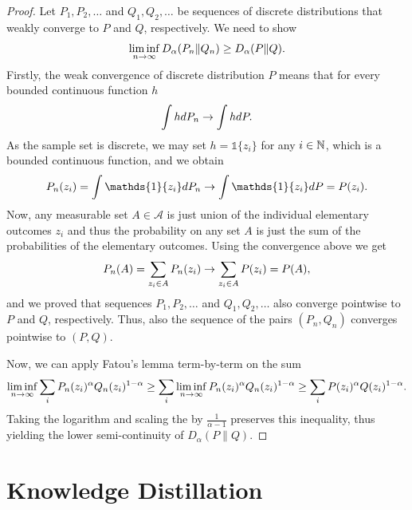 \begin{proof}
	Let $P_1,P_2,\dots$ and $Q_1,Q_2,\dots$ be sequences of discrete distributions that weakly converge to $P$ and $Q$, respectively. We need to show
	\begin{equation*}
		\liminf_{n \rightarrow \infty} D_\alpha(P_n \| Q_n) \geq D_\alpha(P \| Q).
	\end{equation*}
	Firstly, the weak convergence of discrete distribution $P$ means that for every bounded continuous function $h$
	\begin{equation*}
		\int h dP_n \rightarrow \int h dP.
	\end{equation*}
	As the sample set is discrete, we may set $h=\mathds{1}\{z_i\}$ for any $i \in \mathbb{N}$, which is a bounded continuous function, and we obtain
	\begin{equation*}
		P_n(z_i) = \int \mathds{1}\{z_i\} dP_n \goto \int \mathds{1}\{z_i\} dP = P(z_i).
	\end{equation*}
	Now, any measurable set $A \in \mathcal{A}$ is just union of the individual elementary outcomes $z_i$  and thus the probability on any set $A$ is just the sum of the probabilities of the elementary outcomes. Using the convergence above we get
	\begin{equation*}
		P_n(A) = \sum_{z_i \in A} P_n(z_i) \rightarrow \sum_{z_i \in A} P(z_i) = P(A),
	\end{equation*}
	and we proved that sequences $P_1,P_2,\dots$ and $Q_1,Q_2,\dots$ also converge pointwise to $P$ and $Q$, respectively. Thus, also the sequence of the pairs $(P_n,Q_n)$ converges pointwise to $(P,Q)$.
	
	Now, we can apply Fatou’s lemma term-by-term on the sum
	\begin{equation*}
		\liminf_{n \rightarrow \infty} \sum_{i} P_n(z_i)^{\alpha} Q_n(z_i)^{1-\alpha} \geq \sum_{i} \liminf_{n \rightarrow \infty} P_n(z_i)^{\alpha} Q_n(z_i)^{1-\alpha} \geq \sum_{i} P(z_i)^{\alpha} Q(z_i)^{1-\alpha}.
	\end{equation*}
	Taking the logarithm and scaling the by $\frac{1}{\alpha-1}$ preserves this inequality, thus yielding the lower semi-continuity of $D_\alpha(P \| Q)$.
	
\end{proof}



\section{Knowledge Distillation}

